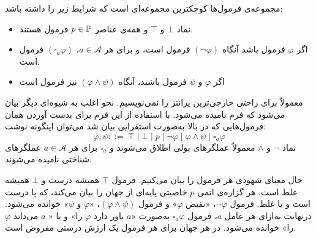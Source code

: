 مجموعه‌ی فرمول‌ها
کوچکترین مجموعه‌ای است که شرایط زیر را داشته باشد:
\begin{itemize}
\item
 نماد $\bot$ و $ \top $
 و همه‌ی عناصر $p\in \mathbb{P}$ فرمول هستند.
\item
اگر $\varphi$ فرمول باشد آنگاه $(\neg\varphi)$ فرمول است، و برای هر $a\in\mathcal{A}$، $(\square_a\varphi)$   فرمول است.
\item
اگر $\varphi$ و $\psi$ فرمول باشند، آنگاه $(\varphi\land\psi)$ نیز فرمول است
\end{itemize}
معمولاً برای راحتی خارجی‌ترین پرانتز را نمی‌نویسیم. نحو اغلب به شیوه‌ای دیگر بیان می‌شود که فرم  نامیده می‌شود. با استفاده از این فرم برای بدست آوردن همان فرمول‌هایی که در بالا به‌صورت استقرایی بیان شد می‌توان اینگونه نوشت:
\begin{equation*}
\varphi,\psi ::=\ \top\mid\bot\mid p\mid \neg\varphi\mid\varphi\land\psi\mid\square_a\varphi
\end{equation*}
نماد $\neg$ و $\land$ معمولاً عملگرهای بولی اطلاق می‌شوند و $\square_a$ برای هر $a\in\mathcal{A}$ عملگرهای شناختی نامیده می‌شوند.

حال معنای شهودی هر فرمول را بیان می‌کنیم. فرمول $ \top $ همیشه درست و $\bot$ همیشه غلط است. هر گزاره‌ی اتمی $p$ خاصیتی پایه‌ای از جهان را بیان می‌کند، که یا درست است و یا غلط. فرمول $\neg\varphi$، «نقیض $\varphi$» و فرمول $(\varphi\land\psi)$، «$\varphi$ و $\psi$» خوانده می‌شود. درنهایت به‌ازای هر عامل $a$، فرمول $\square_a\varphi$ به‌صورت «$a$ باور دارد $\varphi$ را» و یا « $a $ می‌داند $ \varphi $ را» خوانده می‌شود. در هر جهان برای هر فرمول یک ارزش درستی مفروض است.

